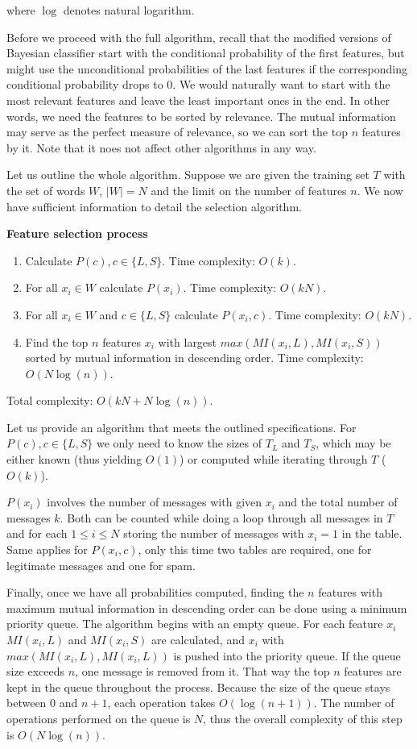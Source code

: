 \documentclass[12pt]{report}
\begin{document}
where $\log$ denotes natural logarithm.

Before we proceed with the full algorithm, recall that the modified versions of Bayesian classifier start with the conditional probability of the first features, but might use the unconditional probabilities of the last features if the corresponding conditional probability drops to $0$. We would naturally want to start with the most relevant features and leave the least important ones in the end. In other words, we need the features to be sorted by relevance. The mutual information may serve as the perfect measure of relevance, so we can sort the top $n$ features by it. Note that it noes not affect other algorithms in any way.

Let us outline the whole algorithm. Suppose we are given the training set $T$ with the set of words $W$, $|W| = N$ and the limit on the number of features $n$. We now have sufficient information to detail the selection algorithm.

\textbf{Feature selection process}

\begin{enumerate}
	\item Calculate $P(c), c \in \{L, S\}$. Time complexity: $O(k)$.
	\item For all $x_i \in W$ calculate $P(x_i)$. Time complexity: $O(kN)$.
	\item For all $x_i \in W$ and $c \in \{L, S\}$ calculate $P(x_i, c)$. Time complexity: $O(kN)$.
	\item Find the top $n$ features $x_i$ with largest $max(MI(x_i, L), MI(x_i, S))$ sorted by mutual information in descending order. Time complexity: $O(N \log(n))$.
\end{enumerate}

Total complexity: $O(kN + N \log(n))$.

Let us provide an algorithm that meets the outlined specifications. For $P(c), c \in \{L, S\}$ we only need to know the sizes of $T_L$ and $T_S$, which may be either known (thus yielding $O(1)$) or computed while iterating through $T$ ($O(k)$).

$P(x_i)$ involves the number of messages with given $x_i$ and the total number of messages $k$. Both can be counted while doing a loop through all messages in $T$ and for each $1 \le i \le N$ storing the number of messages with $x_i = 1$ in the table. Same applies for $P(x_i, c)$, only this time two tables are required, one for legitimate messages and one for spam.

Finally, once we have all probabilities computed, finding the $n$ features with maximum mutual information in descending order can be done using a minimum priority queue. The algorithm begins with an empty queue. For each feature $x_i$ $MI(x_i, L)$ and $MI(x_i, S)$ are calculated, and $x_i$ with $max(MI(x_i, L), MI(x_i, L))$ is pushed into the priority queue. If the queue size exceeds $n$, one message is removed from it. That way the top $n$ features are kept in the queue throughout the process. Because the size of the queue stays between $0$ and $n + 1$, each operation takes $O(\log(n + 1))$. The number of operations performed on the queue is $N$, thus the overall complexity of this step is $O(N \log(n))$.
\end{document}
